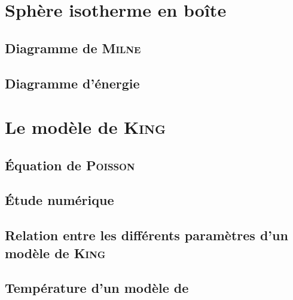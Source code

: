 \chapter{Sphère isotherme en boîte\label{SIB::Chapitre}} %
	\minitoc

	\section{Diagramme de \textsc{Milne}}
		

	\section{Diagramme d'énergie}
		

%			

\chapter{Le modèle de \textsc{King}\label{King::Chapitre}}
	\minitoc

	\section{Équation de \textsc{Poisson}}
		

	\section{Étude numérique}
		

	\section[Relation entre les paramètres]{Relation entre les différents paramètres d'un modèle de \textsc{King}\label{pente-coeff_sec}}
		

	\section{Température d'un modèle de \King \label{sec::temp}}
		

